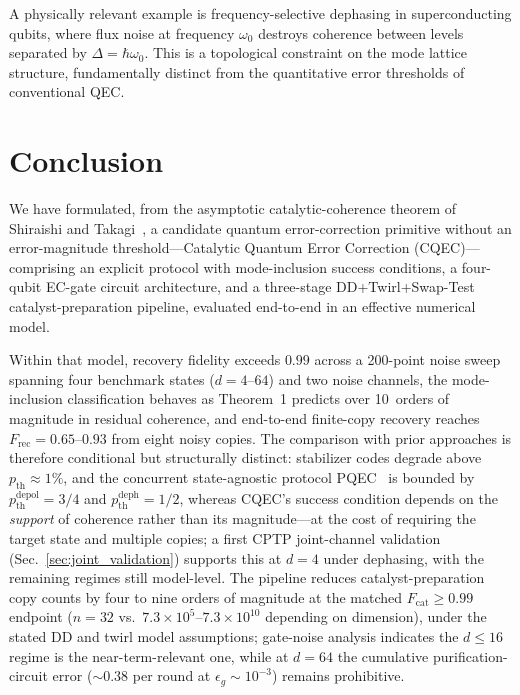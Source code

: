 \documentclass[a4paper,twocolumn]{quantumarticle}
\begin{document}
A physically relevant example is frequency-selective dephasing in superconducting qubits, where flux noise at frequency $\omega_0$ destroys coherence between levels separated by $\Delta = \hbar\omega_0$.
This is a topological constraint on the mode lattice structure, fundamentally distinct from the quantitative error thresholds of conventional QEC.


\section{Conclusion}
\label{sec:conclusion}

We have formulated, from the asymptotic catalytic-coherence theorem of Shiraishi and Takagi~\cite{Shiraishi2024}, a candidate quantum error-correction primitive without an error-magnitude threshold---Catalytic Quantum Error Correction (CQEC)---comprising an explicit protocol with mode-inclusion success conditions, a four-qubit EC-gate circuit architecture, and a three-stage DD+Twirl+Swap-Test catalyst-preparation pipeline, evaluated end-to-end in an effective numerical model.

Within that model, recovery fidelity exceeds $0.99$ across a 200-point noise sweep spanning four benchmark states ($d = 4$--$64$) and two noise channels, the mode-inclusion classification behaves as Theorem~1 predicts over 10~orders of magnitude in residual coherence, and end-to-end finite-copy recovery reaches $F_\mathrm{rec} = 0.65$--$0.93$ from eight noisy copies.
The comparison with prior approaches is therefore conditional but structurally distinct: stabilizer codes degrade above $p_\mathrm{th} \approx 1\%$, and the concurrent state-agnostic protocol PQEC~\cite{Raghoonanan2026} is bounded by $p_\mathrm{th}^\mathrm{depol} = 3/4$ and $p_\mathrm{th}^\mathrm{deph} = 1/2$, whereas CQEC's success condition depends on the \emph{support} of coherence rather than its magnitude---at the cost of requiring the target state and multiple copies; a first CPTP joint-channel validation (Sec.~\ref{sec:joint_validation}) supports this at $d = 4$ under dephasing, with the remaining regimes still model-level.
The pipeline reduces catalyst-preparation copy counts by four to nine orders of magnitude at the matched $F_\mathrm{cat} \geq 0.99$ endpoint ($n = 32$ vs.\ $7.3 \times 10^{5}$--$7.3 \times 10^{10}$ depending on dimension), under the stated DD and twirl model assumptions; gate-noise analysis indicates the $d \leq 16$ regime is the near-term-relevant one, while at $d = 64$ the cumulative purification-circuit error ($\sim\!0.38$ per round at $\epsilon_g \sim 10^{-3}$) remains prohibitive.
\end{document}
